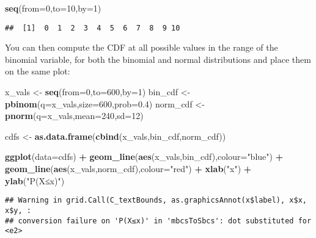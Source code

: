 \documentclass[
]{book}
\newenvironment{Shaded}{\begin{snugshade}}{\end{snugshade}}
\newcommand{\AttributeTok}[1]{\textcolor[rgb]{0.13,0.29,0.53}{#1}}
\newcommand{\DecValTok}[1]{\textcolor[rgb]{0.00,0.00,0.81}{#1}}
\newcommand{\FloatTok}[1]{\textcolor[rgb]{0.00,0.00,0.81}{#1}}
\newcommand{\FunctionTok}[1]{\textcolor[rgb]{0.13,0.29,0.53}{\textbf{#1}}}
\newcommand{\NormalTok}[1]{#1}
\newcommand{\OtherTok}[1]{\textcolor[rgb]{0.56,0.35,0.01}{#1}}
\newcommand{\SpecialCharTok}[1]{\textcolor[rgb]{0.81,0.36,0.00}{\textbf{#1}}}
\newcommand{\StringTok}[1]{\textcolor[rgb]{0.31,0.60,0.02}{#1}}
\begin{document}
\begin{Shaded}
\begin{Highlighting}[]
\FunctionTok{seq}\NormalTok{(}\AttributeTok{from=}\DecValTok{0}\NormalTok{,}\AttributeTok{to=}\DecValTok{10}\NormalTok{,}\AttributeTok{by=}\DecValTok{1}\NormalTok{)}
\end{Highlighting}
\end{Shaded}

\begin{verbatim}
##  [1]  0  1  2  3  4  5  6  7  8  9 10
\end{verbatim}

You can then compute the CDF at all possible values in the range of the binomial variable, for both the binomial and normal distributions and place them on the same plot:

\begin{Shaded}
\begin{Highlighting}[]
\NormalTok{x\_vals }\OtherTok{\textless{}{-}} \FunctionTok{seq}\NormalTok{(}\AttributeTok{from=}\DecValTok{0}\NormalTok{,}\AttributeTok{to=}\DecValTok{600}\NormalTok{,}\AttributeTok{by=}\DecValTok{1}\NormalTok{)}
\NormalTok{bin\_cdf }\OtherTok{\textless{}{-}} \FunctionTok{pbinom}\NormalTok{(}\AttributeTok{q=}\NormalTok{x\_vals,}\AttributeTok{size=}\DecValTok{600}\NormalTok{,}\AttributeTok{prob=}\FloatTok{0.4}\NormalTok{)}
\NormalTok{norm\_cdf }\OtherTok{\textless{}{-}} \FunctionTok{pnorm}\NormalTok{(}\AttributeTok{q=}\NormalTok{x\_vals,}\AttributeTok{mean=}\DecValTok{240}\NormalTok{,}\AttributeTok{sd=}\DecValTok{12}\NormalTok{)}

\NormalTok{cdfs }\OtherTok{\textless{}{-}} \FunctionTok{as.data.frame}\NormalTok{(}\FunctionTok{cbind}\NormalTok{(x\_vals,bin\_cdf,norm\_cdf))}

\FunctionTok{ggplot}\NormalTok{(}\AttributeTok{data=}\NormalTok{cdfs) }\SpecialCharTok{+} \FunctionTok{geom\_line}\NormalTok{(}\FunctionTok{aes}\NormalTok{(x\_vals,bin\_cdf),}\AttributeTok{colour=}\StringTok{"blue"}\NormalTok{) }\SpecialCharTok{+} \FunctionTok{geom\_line}\NormalTok{(}\FunctionTok{aes}\NormalTok{(x\_vals,norm\_cdf),}\AttributeTok{colour=}\StringTok{"red"}\NormalTok{) }\SpecialCharTok{+} \FunctionTok{xlab}\NormalTok{(}\StringTok{"x"}\NormalTok{) }\SpecialCharTok{+} \FunctionTok{ylab}\NormalTok{(}\StringTok{"P(X≤x)"}\NormalTok{) }
\end{Highlighting}
\end{Shaded}

\begin{verbatim}
## Warning in grid.Call(C_textBounds, as.graphicsAnnot(x$label), x$x, x$y, :
## conversion failure on 'P(X≤x)' in 'mbcsToSbcs': dot substituted for <e2>
\end{verbatim}
\end{document}
